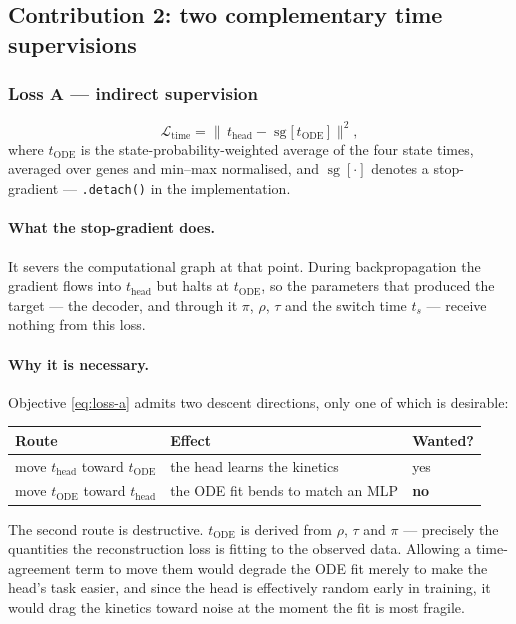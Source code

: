 \documentclass[11pt,a4paper]{article}
\newcommand{\ts}{t_{s}}
\newcommand{\sg}{\operatorname{sg}}
\theoremstyle{definition}
\begin{document}
\subsection{Contribution 2: two complementary time supervisions}

\subsubsection{Loss A --- indirect supervision}

\begin{equation}
\mathcal{L}_{\text{time}}
= \big\lVert\, t_{\text{head}} - \sg\big[\, t_{\text{ODE}} \,\big] \,\big\rVert^2,
\label{eq:loss-a}
\end{equation}
%
where $t_{\text{ODE}}$ is the state-probability-weighted average of the four
state times, averaged over genes and min--max normalised, and $\sg[\cdot]$
denotes a stop-gradient --- \texttt{.detach()} in the implementation.

\paragraph{What the stop-gradient does.} It severs the computational graph at
that point. During backpropagation the gradient flows into $t_{\text{head}}$
but halts at $t_{\text{ODE}}$, so the parameters that produced the target ---
the decoder, and through it $\pi$, $\rho$, $\tau$ and the switch time $\ts$ ---
receive nothing from this loss.

\paragraph{Why it is necessary.} Objective \eqref{eq:loss-a} admits two descent
directions, only one of which is desirable:

\begin{center}
\begin{tabular}{@{}lll@{}}
\toprule
\textbf{Route} & \textbf{Effect} & \textbf{Wanted?} \\
\midrule
move $t_{\text{head}}$ toward $t_{\text{ODE}}$ & the head learns the kinetics & yes \\
move $t_{\text{ODE}}$ toward $t_{\text{head}}$ & the ODE fit bends to match an MLP & \textbf{no} \\
\bottomrule
\end{tabular}
\end{center}

The second route is destructive. $t_{\text{ODE}}$ is derived from $\rho$, $\tau$
and $\pi$ --- precisely the quantities the reconstruction loss is fitting to the
observed data. Allowing a time-agreement term to move them would degrade the
ODE fit merely to make the head's task easier, and since the head is
effectively random early in training, it would drag the kinetics toward noise
at the moment the fit is most fragile.
\end{document}
